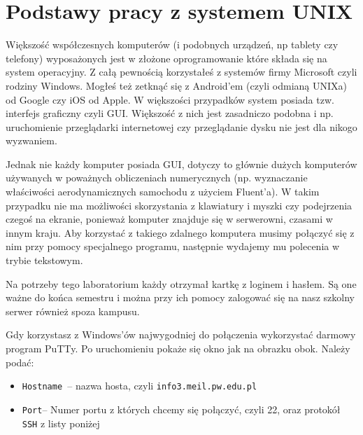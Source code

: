\documentclass{instrukcja}
\begin{document}
\author{M. Dzikowski}
\materialtitle

\section{Podstawy pracy z systemem UNIX}

Większość współczesnych komputerów (i podobnych urządzeń, np tablety czy telefony) wyposażonych jest w złożone oprogramowanie które składa się na system operacyjny. Z całą pewnością korzystałeś z systemów firmy Microsoft czyli rodziny Windows. Mogłeś też zetknąć się z Android'em  (czyli odmianą UNIXa) od Google czy iOS od Apple. W większości przypadków system posiada tzw. interfejs graficzny czyli GUI. Większość z nich jest zasadniczo podobna i np. uruchomienie przeglądarki internetowej czy przeglądanie dysku nie jest dla nikogo wyzwaniem.

Jednak nie każdy komputer posiada GUI, dotyczy to głównie dużych komputerów używanych w poważnych obliczeniach numerycznych (np. wyznaczanie właściwości aerodynamicznych samochodu z użyciem Fluent'a). W takim przypadku nie ma możliwości skorzystania z klawiatury i myszki czy podejrzenia czegoś na ekranie, ponieważ komputer znajduje się w serwerowni, czasami w innym kraju. Aby korzystać z takiego zdalnego komputera musimy połączyć się z nim przy pomocy specjalnego programu, następnie wydajemy mu polecenia w trybie tekstowym.

Na potrzeby tego laboratorium każdy otrzymał kartkę z loginem i hasłem. Są one ważne do końca semestru i można przy ich pomocy zalogować się na nasz szkolny serwer również spoza kampusu.

Gdy korzystasz z Windows'ów najwygodniej do połączenia wykorzystać darmowy program PuTTy. Po uruchomieniu pokaże się okno jak na obrazku obok. Należy podać:
\begin{itemize}
\item {\tt Hostname }-- nazwa hosta, czyli {\tt info3.meil.pw.edu.pl}
\item {\tt Port}-- Numer portu z których chcemy się połączyć, czyli 22, oraz protokół {\tt SSH} z listy poniżej
\end{itemize}


\end{document}
